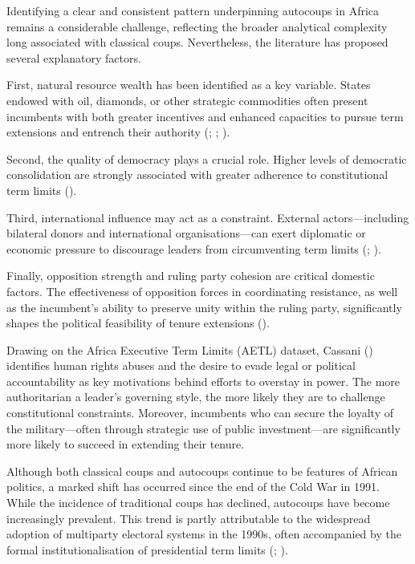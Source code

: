\documentclass[
  12pt,
]{report}
\begin{document}
Identifying a clear and consistent pattern underpinning autocoups in
Africa remains a considerable challenge, reflecting the broader
analytical complexity long associated with classical coups.
Nevertheless, the literature has proposed several explanatory factors.

First, natural resource wealth has been identified as a key variable.
States endowed with oil, diamonds, or other strategic commodities often
present incumbents with both greater incentives and enhanced capacities
to pursue term extensions and entrench their authority
(;
;
).

Second, the quality of democracy plays a crucial role. Higher levels of
democratic consolidation are strongly associated with greater adherence
to constitutional term limits ().

Third, international influence may act as a constraint. External
actors---including bilateral donors and international
organisations---can exert diplomatic or economic pressure to discourage
leaders from circumventing term limits (; ).

Finally, opposition strength and ruling party cohesion are critical
domestic factors. The effectiveness of opposition forces in coordinating
resistance, as well as the incumbent's ability to preserve unity within
the ruling party, significantly shapes the political feasibility of
tenure extensions ().

Drawing on the Africa Executive Term Limits (AETL) dataset, Cassani
() identifies human rights abuses and
the desire to evade legal or political accountability as key motivations
behind efforts to overstay in power. The more authoritarian a leader's
governing style, the more likely they are to challenge constitutional
constraints. Moreover, incumbents who can secure the loyalty of the
military---often through strategic use of public investment---are
significantly more likely to succeed in extending their tenure.

Although both classical coups and autocoups continue to be features of
African politics, a marked shift has occurred since the end of the Cold
War in 1991. While the incidence of traditional coups has declined,
autocoups have become increasingly prevalent. This trend is partly
attributable to the widespread adoption of multiparty electoral systems
in the 1990s, often accompanied by the formal institutionalisation of
presidential term limits (;
).
\end{document}
